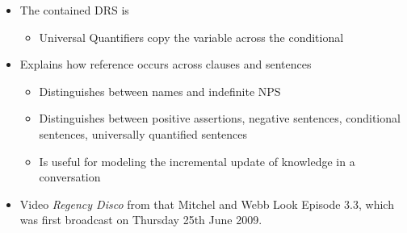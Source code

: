 \documentclass[headrule,footrule]{foils}
\begin{document}

\begin{exe}
   \ex 
  \begin{xlist}
    \ex {}
  \end{xlist}
  \ex 
  \end{exe}
  \begin{itemize}
  \item The contained DRS is 
    \begin{itemize}
    \item Universal Quantifiers copy the variable across the conditional
    \end{itemize}
  \end{itemize}

\begin{itemize}
\item Explains how reference occurs across clauses and sentences
  \begin{itemize}
  \item Distinguishes between names and indefinite NPS
  \item Distinguishes between positive assertions, negative sentences,
    conditional sentences, universally quantified sentences
  \item Is useful for modeling the incremental update of knowledge in a conversation
  \end{itemize}
\end{itemize}


\begin{itemize}
\item Video \textit{Regency Disco} from that Mitchel and Webb Look Episode 3.3, which was first broadcast on Thursday 25th June 2009.
\end{itemize}
 
\end{document}
